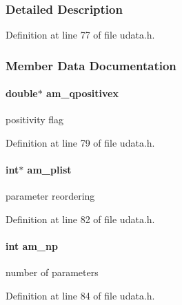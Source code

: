 \subsubsection{Detailed Description}


Definition at line 77 of file udata.\+h.



\subsubsection{Member Data Documentation}
\hypertarget{struct_user_data_a24dcfe2da485ad1964d807779fce2092}{}
\paragraph[{am\+\_\+qpositivex}]{\setlength{\rightskip}{0pt plus 5cm}double$\ast$ am\+\_\+qpositivex}\label{struct_user_data_a24dcfe2da485ad1964d807779fce2092}
positivity flag 

Definition at line 79 of file udata.\+h.

\hypertarget{struct_user_data_a122fcb4f213656e29d30e1e8713fcf1c}{}
\paragraph[{am\+\_\+plist}]{\setlength{\rightskip}{0pt plus 5cm}int$\ast$ am\+\_\+plist}\label{struct_user_data_a122fcb4f213656e29d30e1e8713fcf1c}
parameter reordering 

Definition at line 82 of file udata.\+h.

\hypertarget{struct_user_data_a1b32993ff88dfae4dd2aab311c24cc26}{}
\paragraph[{am\+\_\+np}]{\setlength{\rightskip}{0pt plus 5cm}int am\+\_\+np}\label{struct_user_data_a1b32993ff88dfae4dd2aab311c24cc26}
number of parameters 

Definition at line 84 of file udata.\+h.

\hypertarget{struct_user_data_a1c8d4eb301c60c34dc4870faca7ce5a4}{}
